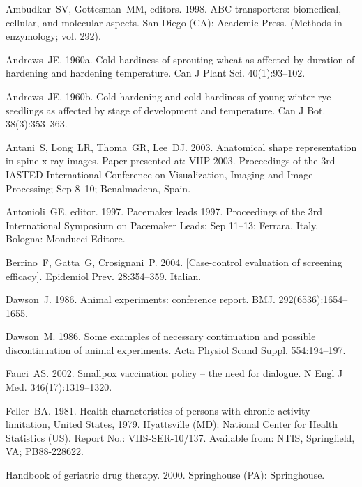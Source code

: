 \documentclass[]{interact}
\theoremstyle{plain}%
\theoremstyle{definition}
\theoremstyle{remark}
\begin{document}
\begin{thebibliography}{}

Ambudkar~SV, Gottesman~MM, editors. 1998. ABC transporters: biomedical,
  cellular, and molecular aspects. San Diego (CA): Academic Press. (Methods
  in enzymology; vol. 292).

Andrews~JE. 1960a. Cold hardiness of sprouting wheat as affected by duration of
  hardening and hardening temperature. Can J Plant Sci. 40(1):93--102.

Andrews~JE. 1960b. Cold hardening and cold hardiness of young winter rye
  seedlings as affected by stage of development and temperature. Can J Bot.
  38(3):353--363.

Antani~S, Long~LR, Thoma~GR, Lee~DJ. 2003. Anatomical shape representation in
  spine x-ray images. Paper presented at: VIIP 2003. Proceedings of the
  3rd IASTED International Conference on Visualization, Imaging and
  Image Processing; Sep 8--10; Benalmadena, Spain.

Antonioli~GE, editor. 1997. Pacemaker leads 1997. Proceedings of the 3rd
  International Symposium on Pacemaker Leads; Sep 11--13; Ferrara, Italy.
  Bologna: Monducci Editore.

Berrino~F, Gatta~G, Crosignani~P. 2004. [Case-control evaluation of screening
  efficacy]. Epidemiol Prev. 28:354--359. Italian.

Dawson~J. 1986. Animal experiments: conference report. BMJ.
  292(6536):1654--1655.

Dawson~M. 1986. Some examples of necessary continuation and
  possible discontinuation of animal experiments. Acta Physiol Scand Suppl.
  554:194--197.

Fauci~AS. 2002. Smallpox vaccination policy -- the need for dialogue. N Engl J
  Med. 346(17):1319--1320.

Feller~BA. 1981. Health characteristics of persons with chronic activity
  limitation, United States, 1979. Hyattsville (MD): National Center for
  Health Statistics (US). Report No.: VHS-SER-10/137. Available from: NTIS,
  Springfield, VA; PB88-228622.

Handbook of geriatric drug therapy. 2000. Springhouse (PA): Springhouse.


\end{thebibliography}
\end{document}
